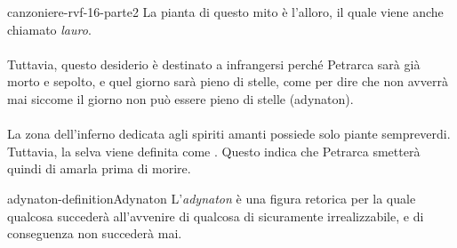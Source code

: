 \documentclass[preview]{standalone}
\begin{document}
\begin{snippet}{canzoniere-rvf-16-parte2}
    La pianta di questo mito è l'alloro, il quale viene anche chiamato \textit{lauro}.
    \\\\
     Tuttavia, questo desiderio è destinato a infrangersi perché Petrarca sarà già morto
    e sepolto, e quel giorno sarà pieno di stelle, come per dire che non avverrà mai siccome
    il giorno non può essere pieno di stelle (adynaton).
    \\\\
    La zona dell'inferno dedicata agli spiriti amanti possiede solo piante sempreverdi.
    Tuttavia, la selva viene definita come .
    Questo indica che Petrarca smetterà quindi di amarla prima di morire.
\end{snippet}

\begin{snippetdefinition}{adynaton-definition}{Adynaton}
    L'\textit{adynaton} è una figura retorica per la quale qualcosa succederà all'avvenire
    di qualcosa di sicuramente irrealizzabile, e di conseguenza non succederà mai.
\end{snippetdefinition}
\end{document}
